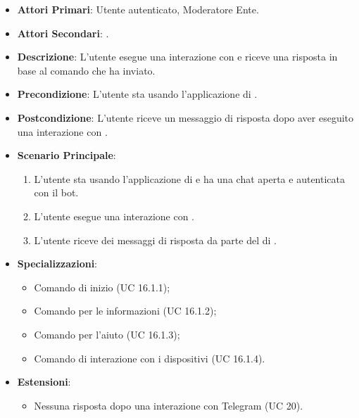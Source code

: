 	\begin{itemize}
		\item \textbf{Attori Primari}: Utente autenticato, Moderatore Ente.
		\item \textbf{Attori Secondari}: .
		\item \textbf{Descrizione}: L'utente esegue una interazione con  e riceve una risposta in base al comando che ha inviato. 
		\item \textbf{Precondizione}: L'utente sta usando l'applicazione di .
		\item \textbf{Postcondizione}: L'utente riceve un messaggio di risposta dopo aver eseguito una interazione con .
		\item \textbf{Scenario Principale}:
		\begin{enumerate}
			\item L'utente sta usando l'applicazione di  e ha una chat aperta e autenticata con il bot. 
			\item L'utente esegue una interazione con .
			\item L'utente riceve dei messaggi di risposta da parte del  di .
		\end{enumerate}
		\item \textbf{Specializzazioni}:
		\begin{itemize}
			\item Comando di inizio (UC 16.1.1);
			\item Comando per le informazioni (UC 16.1.2);
			\item Comando per l'aiuto (UC 16.1.3);
			\item Comando di interazione con i dispositivi (UC 16.1.4).
		\end{itemize}
		\item \textbf{Estensioni}:
		\begin{itemize}
			\item Nessuna risposta dopo una interazione con Telegram (UC 20).
		\end{itemize}
	\end{itemize}


